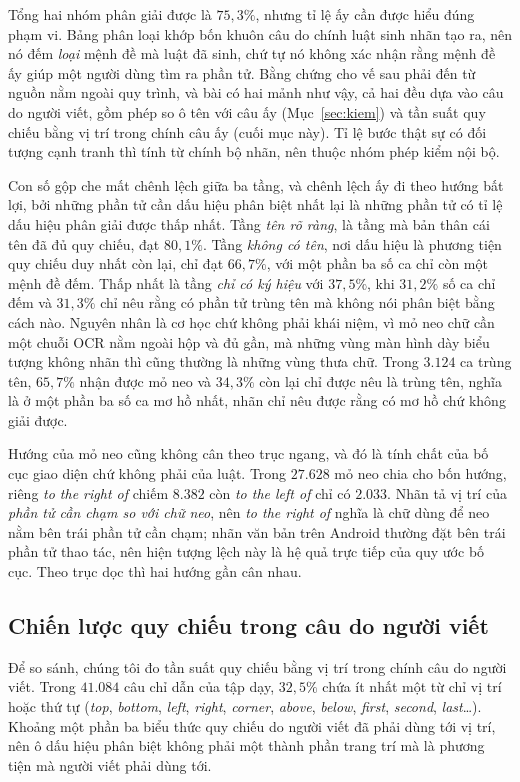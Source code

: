 \documentclass[12pt,a4paper,onecolumn]{article}
\newcommand{\ôvuông}[2]{\tikz[baseline=-0.45ex]{\draw[#1,line width=0.9pt,#2] (0,0) rectangle (0.34,0.18);}}
\begin{document}
Tổng hai nhóm phân giải được là $75{,}3\%$, nhưng tỉ lệ ấy cần được hiểu đúng phạm vi. Bảng
phân loại khớp bốn khuôn câu do chính luật sinh nhãn tạo ra, nên nó đếm \emph{loại} mệnh đề
mà luật đã sinh, chứ tự nó không xác nhận rằng mệnh đề ấy giúp một người dùng tìm ra phần
tử.
Bằng chứng cho vế sau phải đến từ nguồn nằm ngoài quy trình, và bài có hai mảnh như vậy,
cả hai đều dựa vào câu do người viết, gồm phép so ô tên với câu ấy
(Mục~\ref{sec:kiem}) và tần suất quy chiếu bằng vị trí trong chính câu ấy (cuối mục này). Tỉ lệ bước thật sự có đối
tượng cạnh tranh thì tính từ chính bộ nhãn, nên thuộc nhóm phép kiểm nội bộ.

Con số gộp che mất chênh lệch giữa ba tầng, và chênh lệch ấy đi theo hướng bất lợi, bởi
những phần tử cần dấu hiệu phân biệt nhất lại là những phần tử có tỉ lệ dấu hiệu phân
giải được thấp nhất. Tầng \emph{tên rõ ràng}, là tầng mà bản thân cái tên đã đủ quy chiếu, đạt $80{,}1\%$. Tầng
\emph{không có tên}, nơi dấu hiệu là phương tiện quy chiếu duy nhất còn lại, chỉ đạt
$66{,}7\%$, với một phần ba số ca chỉ còn một mệnh đề đếm. Thấp nhất là tầng \emph{chỉ có ký hiệu} với $37{,}5\%$, khi $31{,}2\%$ số ca chỉ đếm và
$31{,}3\%$ chỉ nêu rằng có phần tử trùng tên mà không nói phân biệt bằng cách nào. Nguyên nhân là cơ học chứ không phải khái niệm, vì mỏ neo chữ cần một chuỗi OCR nằm ngoài
hộp và đủ gần, mà những vùng màn hình dày biểu tượng không nhãn thì cũng thường là những
vùng thưa chữ. Trong $3.124$ ca trùng tên, $65{,}7\%$ nhận được mỏ neo và $34{,}3\%$
còn lại chỉ được nêu là trùng tên, nghĩa là ở một phần ba số ca mơ hồ nhất, nhãn chỉ nêu được rằng có mơ hồ chứ không giải được.

Hướng của mỏ neo cũng không cân theo trục ngang, và đó là tính chất của bố cục giao diện
chứ không phải của luật. Trong $27.628$ mỏ neo chia cho bốn hướng, riêng \emph{to the
right of} chiếm $8.382$ còn \emph{to the left of} chỉ có $2.033$. Nhãn tả vị trí của
\emph{phần tử cần chạm so với chữ neo}, nên \emph{to the right of} nghĩa là chữ dùng để neo
nằm bên trái phần tử cần chạm; nhãn văn bản trên Android thường đặt bên trái phần tử thao tác,
nên hiện tượng lệch này là hệ quả trực tiếp của quy ước bố cục. Theo trục dọc thì hai
hướng gần cân nhau.

\subsection{Chiến lược quy chiếu trong câu do người viết}

Để so sánh, chúng tôi đo tần suất quy chiếu bằng vị trí trong chính câu do người viết. Trong $41.084$
câu chỉ dẫn của tập dạy, $32{,}5\%$ chứa ít nhất một từ chỉ vị trí hoặc thứ tự (\emph{top}, \emph{bottom}, \emph{left}, \emph{right}, \emph{corner}, \emph{above},
\emph{below}, \emph{first}, \emph{second}, \emph{last}\ldots). Khoảng một phần ba biểu
thức quy chiếu do người viết đã phải dùng tới vị trí, nên ô dấu hiệu phân biệt không phải
một thành phần trang trí mà là phương tiện mà người viết phải dùng tới.
\end{document}
